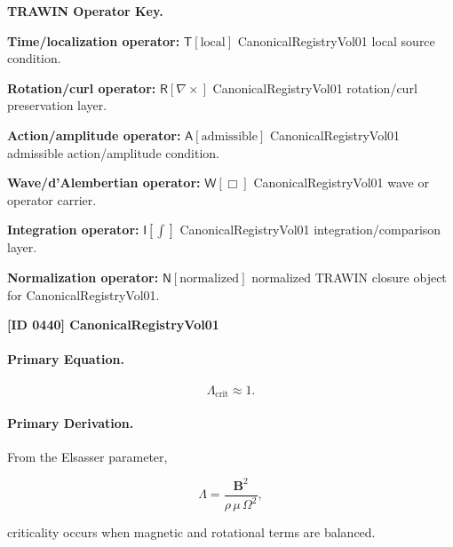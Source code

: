 \par\vspace{0.45\baselineskip}
\noindent\begin{minipage}[t]{\linewidth}
\begingroup
\small
\raggedright
\textbf{TRAWIN Operator Key.}\par
\noindent\textbf{Time/localization operator:} $\mathsf{T}\!\left[\mathrm{local}\right]$ CanonicalRegistryVol01 local source condition.\par
\noindent\textbf{Rotation/curl operator:} $\mathsf{R}\!\left[\nabla\times\right]$ CanonicalRegistryVol01 rotation/curl preservation layer.\par
\noindent\textbf{Action/amplitude operator:} $\mathsf{A}\!\left[\mathrm{admissible}\right]$ CanonicalRegistryVol01 admissible action/amplitude condition.\par
\noindent\textbf{Wave/d'Alembertian operator:} $\mathsf{W}\!\left[\Box\right]$ CanonicalRegistryVol01 wave or operator carrier.\par
\noindent\textbf{Integration operator:} $\mathsf{I}\!\left[\int\right]$ CanonicalRegistryVol01 integration/comparison layer.\par
\noindent\textbf{Normalization operator:} $\mathsf{N}\!\left[\mathrm{normalized}\right]$ normalized TRAWIN closure object for CanonicalRegistryVol01.\par
\endgroup
\end{minipage}

\clearpage
\noindent\textbf{[ID 0440] CanonicalRegistryVol01}\par
\vspace{0.35em}
\paragraph{Primary Equation.}
\begin{equation}
\Lambda_{\mathrm{crit}}\approx 1 .
\end{equation}

\paragraph{Primary Derivation.}
From the Elsasser parameter,

\begin{equation}
\Lambda
=
\frac{\mathbf{B}^2}
{\rho\,\mu\,\Omega^2},
\end{equation}

criticality occurs when magnetic and rotational terms are balanced.

